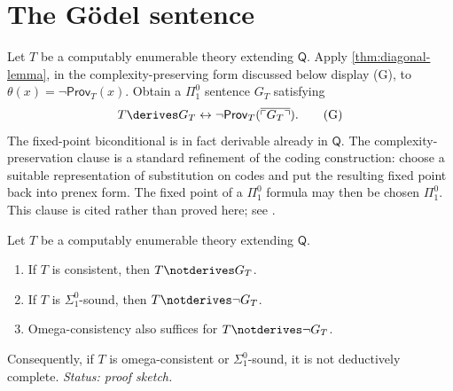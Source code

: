 \section{The G\"odel sentence}
\label{sec:first-incompleteness-03}

Let \(T\) be a computably enumerable theory extending \(\mathsf Q\).  Apply
\cref{thm:diagonal-lemma}, in the complexity-preserving form discussed
below display (G), to
\(\theta(x)=\neg\mathsf{Prov}_T(x)\).  Obtain a \(\Pi^0_1\) sentence \(G_T\)
satisfying
\[
  T\derives G_T\leftrightarrow
  \neg\mathsf{Prov}_T(\overline{\ulcorner G_T\urcorner}).
  \tag{G}
\]
The fixed-point biconditional is in fact derivable already in \(\mathsf Q\).
The complexity-preservation clause is a standard refinement of the coding
construction: choose a suitable representation of substitution on codes and
put the resulting fixed point back into prenex form.  The fixed point of a
\(\Pi^0_1\) formula may then be chosen \(\Pi^0_1\).  This clause is cited
rather than proved here; see
\cite{Shoenfield1967}.

\begin{theorem}
\label{thm:godel-first}
Let \(T\) be a computably enumerable theory extending \(\mathsf Q\).
\begin{enumerate}
  \item If \(T\) is consistent, then \(T\notderives G_T\).
  \item If \(T\) is \(\Sigma^0_1\)-sound, then
        \(T\notderives\neg G_T\).
  \item Omega-consistency also suffices for
        \(T\notderives\neg G_T\).
\end{enumerate}
Consequently, if \(T\) is omega-consistent or \(\Sigma^0_1\)-sound, it is not
deductively complete.
\textit{Status: proof sketch.}
\end{theorem}

